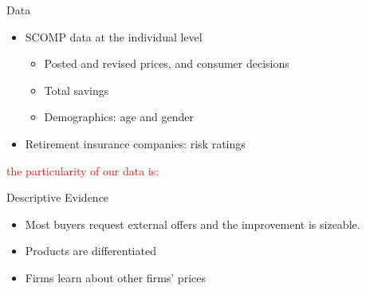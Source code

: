 \documentclass[10pt,aspectratio=169]{beamer}
\begin{document}
\begin{frame}{Data} \label{slide:data}
\begin{itemize}
    \item SCOMP data at the individual level  
    \begin{itemize}
        \item Posted and revised prices, and consumer decisions 
        \item Total savings 
        \item Demographics: age and gender \hyperlink{slide:fig5}{}
    \end{itemize}
     \item Retirement insurance companies: risk ratings
\end{itemize}

\textcolor{red}{the particularity of our data is: }
\end{frame}

 

\begin{frame}{Descriptive Evidence}\label{slide:Descriptive_evidence}
\begin{itemize}
    \item Most buyers request external offers and the improvement is sizeable. \hyperlink{slide:fig1}{} 
    \item Products are differentiated \hyperlink{slide:fig2}{} 
    \item Firms learn about other firms' prices
\end{itemize}
\end{frame}


\end{document}
